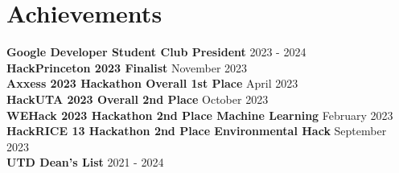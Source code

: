 \documentclass[11pt,letterpaper]{article}%
\begin{document}
\section{Achievements}
%
 \begin{itemize}[leftmargin=0.15in, label={}]
%
    \small{\item{
    
        \textbf{Google Developer Student Club President} \hfill {2023 {-} 2024} \\
%
     \textbf{HackPrinceton 2023 Finalist} \hfill {November 2023} \\
%
     \textbf{Axxess 2023 Hackathon Overall 1st Place} \hfill {April 2023} \\
%
     \textbf{HackUTA 2023 Overall 2nd Place} \hfill {October 2023} \\
%
     \textbf{WEHack 2023 Hackathon 2nd Place Machine Learning} \hfill {February 2023} \\
%
     \textbf{HackRICE 13 Hackathon 2nd Place Environmental Hack} \hfill {September 2023} \\
%
     \textbf{UTD Dean's List} \hfill {2021 {-} 2024} \\
%
    }}
%
 \end{itemize}
%

%
\end{document}
